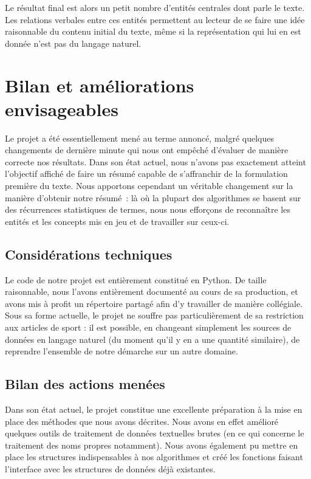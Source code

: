 \documentclass[a4paper, 12pt]{article}
\begin{document}
Le résultat final est alors un petit nombre d'entités centrales dont parle le texte. Les relations verbales entre ces entités permettent au lecteur de se faire une idée raisonnable du contenu initial du texte, même si la représentation qui lui en est donnée n'est pas du langage naturel.


\section{Bilan et améliorations envisageables}

Le projet a été essentiellement mené au terme annoncé, malgré quelques changements de dernière minute qui nous ont empêché d'évaluer de manière correcte nos résultats. Dans son état actuel, nous n'avons pas exactement atteint l'objectif affiché de faire un résumé capable de s'affranchir de la formulation première du texte. Nous apportons cependant un véritable changement sur la manière d'obtenir notre résumé~: là où la plupart des algorithmes se basent sur des récurrences statistiques de termes, nous nous efforçons de reconnaître les entités et les concepts mis en jeu et de travailler sur ceux-ci.


\subsection{Considérations techniques}

Le code de notre projet est entièrement constitué en Python. De taille raisonnable, nous l'avons entièrement documenté au cours de sa production, et avons mis à profit un répertoire partagé afin d'y travailler de manière collégiale.\\

Sous sa forme actuelle, le projet ne souffre pas particulièrement de sa restriction aux articles de sport : il est possible, en changeant simplement les sources de données en langage naturel (du moment qu'il  y en a une quantité similaire), de reprendre l'ensemble de notre démarche sur un autre domaine.


\subsection{Bilan des actions menées}

Dans son état actuel, le projet constitue une excellente préparation à la mise en place des méthodes que nous avons décrites. Nous avons en effet amélioré quelques outils de traitement de données textuelles brutes (en ce qui concerne le traitement des noms propres notamment). Nous avons également pu mettre en place les structures indispensables à nos algorithmes et créé les fonctions faisant l'interface avec les structures de données déjà existantes.
\end{document}
